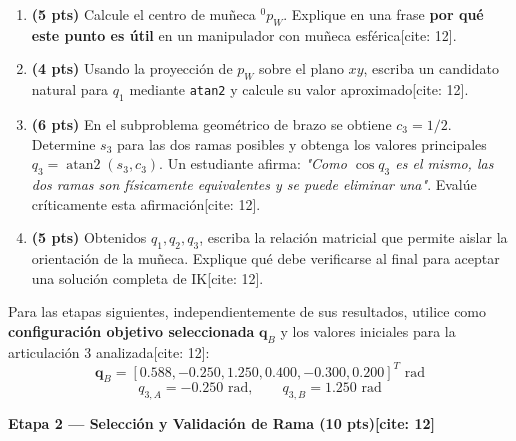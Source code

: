 \documentclass[11pt, a4paper]{article}
\begin{document}
\begin{enumerate}[label=\textbf{1.\arabic*.}]
    \item \textbf{(5 pts)} Calcule el centro de muñeca ${}^0p_W$. Explique en una frase \textbf{por qué este punto es útil} en un manipulador con muñeca esférica[cite: 12].
    \item \textbf{(4 pts)} Usando la proyección de $p_W$ sobre el plano $xy$, escriba un candidato natural para $q_1$ mediante \texttt{atan2} y calcule su valor aproximado[cite: 12].
    \item \textbf{(6 pts)} En el subproblema geométrico de brazo se obtiene $c_3 = 1/2$. Determine $s_3$ para las dos ramas posibles y obtenga los valores principales $q_3 = \operatorname{atan2}(s_3, c_3)$. Un estudiante afirma: \textit{"Como $\cos q_3$ es el mismo, las dos ramas son físicamente equivalentes y se puede eliminar una"}. Evalúe críticamente esta afirmación[cite: 12].
    \item \textbf{(5 pts)} Obtenidos $q_1, q_2, q_3$, escriba la relación matricial que permite aislar la orientación de la muñeca. Explique qué debe verificarse al final para aceptar una solución completa de IK[cite: 12].
\end{enumerate}

\begin{tcolorbox}[colback=yellow!10, colframe=orange, title=\textbf{Checkpoint de Continuidad A}]
    Para las etapas siguientes, independientemente de sus resultados, utilice como \textbf{configuración objetivo seleccionada} $\mathbf{q}_B$ y los valores iniciales para la articulación 3 analizada[cite: 12]:
    \begin{equation*}
        \mathbf{q}_B = [0.588, -0.250, 1.250, 0.400, -0.300, 0.200]^T \text{ rad}
    \end{equation*}
    \begin{equation*}
        q_{3,A} = -0.250 \text{ rad}, \qquad q_{3,B} = 1.250 \text{ rad}
    \end{equation*}
\end{tcolorbox}

\noindent\textbf{\large Etapa 2 — Selección y Validación de Rama (10 pts)[cite: 12]}
\end{document}
